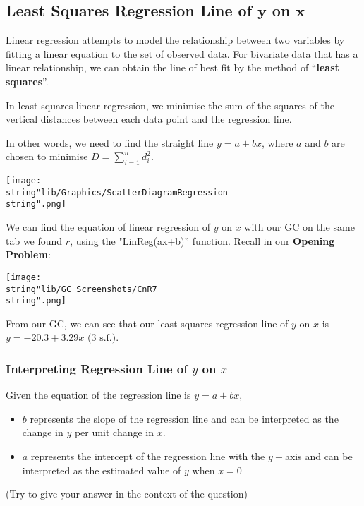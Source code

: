 \documentclass[11pt,a4paper]{book}
\begin{document}
\subsection{Least Squares Regression Line of $\boldsymbol{y}$ on $\boldsymbol{x}$}

Linear regression attempts to model the relationship between two variables
by fitting a linear equation to the set of observed data. For bivariate
data that has a linear relationship, we can obtain the line of best
fit by the method of ``\textbf{least squares}''.

\begin{minipage}[t]{.5\textwidth}

In least squares linear regression, we minimise the sum of the squares
of the vertical distances between each data point and the regression
line.

\medskip

In other words, we need to find the straight line $y=a+bx$, where
$a$ and $b$ are chosen to minimise ${\displaystyle D=\sum_{i=1}^{n}d_{i}^{2}}$.

\end{minipage}
\begin{minipage}[t]{.5\textwidth}
\begin{center}
\texttt{[image: \\string"lib/Graphics/ScatterDiagramRegression\\string".png]}
\par\end{center}

\end{minipage}

We can find the equation of linear regression of $y$ on $x$ with
our GC on the same tab we found $r$, using the "LinReg(ax+b)'' function.
Recall in our \textbf{Opening Problem}:
\begin{center}
\texttt{[image: \\string"lib/GC Screenshots/CnR7\\string".png]}
\par\end{center}

From our GC, we can see that our least squares regression line of
$y$ on $x$ is $y=-20.3+3.29x\text{ (3 s.f.)}$.

\subsubsection{Interpreting Regression Line of $y$ on $x$}

Given the equation of the regression line is $y=a+bx$,
\begin{itemize}
\item $b$ represents the slope of the regression line and can be interpreted
as the change in $y$ per unit change in $x$.
\item $a$ represents the intercept of the regression line with the $y-$axis
and can be interpreted as the estimated value of $y$ when $x=0$
\end{itemize}
(Try to give your answer in the context of the question)
\end{document}
